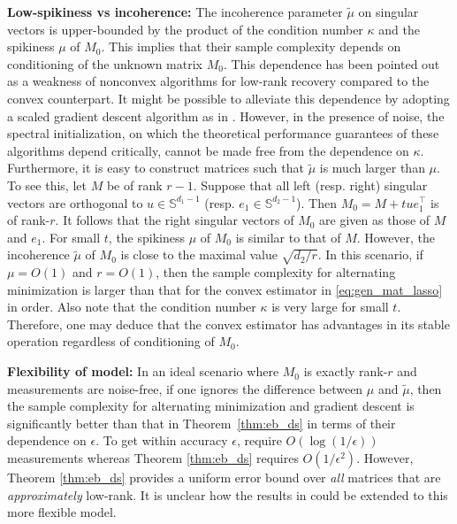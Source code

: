 \documentclass[11pt]{article}
\begin{document}
\textbf{Low-spikiness vs incoherence:} 
The incoherence parameter $\tilde{\mu}$ on singular vectors is upper-bounded by the product of the condition number $\kappa$ and the spikiness $\mu$ of $M_0$. 
This implies that their sample complexity depends on conditioning of the unknown matrix $M_0$. 
This dependence has been pointed out as a weakness of nonconvex algorithms for low-rank recovery compared to the convex counterpart. 
It might be possible to alleviate this dependence by adopting a scaled gradient descent algorithm as in \citep{tong2020accelerating}. 
However, in the presence of noise, the spectral initialization, on which the theoretical performance guarantees of these algorithms depend critically, cannot be made free from the dependence on $\kappa$. 
Furthermore, it is easy to construct matrices such that $\tilde{\mu}$ is much larger than $\mu$.  To see this, let $M$ be of rank $r-1$. 
Suppose that all left (resp. right) singular vectors are orthogonal to $u \in \mathbb{S}^{d_1-1}$ (resp. $e_1 \in \mathbb{S}^{d_2-1}$). 
Then $M_0 = M + t u e_1^\top$ is of rank-$r$. 
It follows that the right singular vectors of $M_0$ are given as those of $M$ and $e_1$. 
For small $t$, the spikiness $\mu$ of $M_0$ is similar to that of $M$. 
However, the incoherence $\tilde{\mu}$ of $M_0$ is close to the maximal value $\sqrt{d_2/r}$. 
In this scenario, if $\mu = O(1)$ and $r = O(1)$, then the sample complexity for alternating minimization is larger than that for the convex estimator in \eqref{eq:gen_mat_lasso} in order. 
Also note that the condition number $\kappa$ is very large for small $t$. 
Therefore, one may deduce that the convex estimator has advantages in its stable operation regardless of conditioning of $M_0$.

\textbf{Flexibility of model:} 
In an ideal scenario where $M_0$ is exactly rank-$r$ and measurements are noise-free, if one ignores the difference between $\mu$ and $\tilde{\mu}$, then the sample complexity for alternating minimization and gradient descent \citep{nayer2019phaseless,nayer2021fast} is significantly better than that in Theorem~\ref{thm:eb_ds} in terms of their dependence on $\epsilon$. 
To get within accuracy $\epsilon$, \citep{nayer2019phaseless,nayer2021fast} require $O(\log(1/\epsilon))$ measurements whereas Theorem \ref{thm:eb_ds} requires $O(1/\epsilon^2)$. However, Theorem \ref{thm:eb_ds} provides a uniform error bound over \textit{all} matrices that are \textit{approximately} low-rank. It is unclear how the results in \citep{nayer2019phaseless,nayer2021fast} could be extended to this more flexible model.
\end{document}
